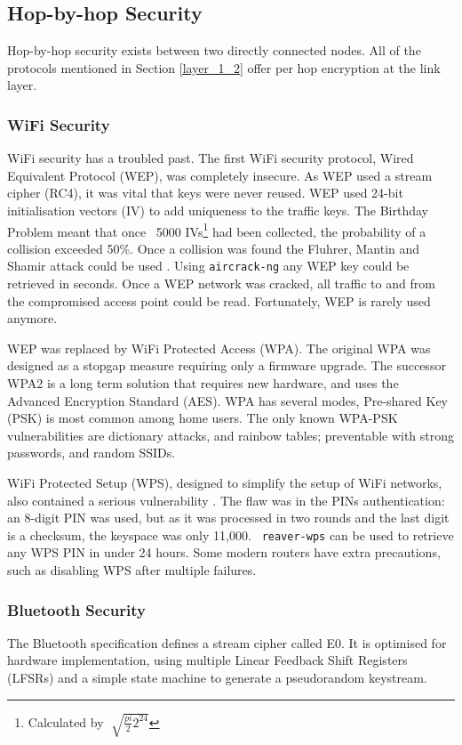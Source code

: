 \documentclass[10pt,journal,compsoc]{IEEEtran}
\begin{document}
\subsection{Hop-by-hop Security}
Hop-by-hop security exists between two directly connected nodes. All of the
protocols mentioned in Section \ref{layer_1_2} offer per hop encryption at the
link layer. 

\subsubsection{WiFi Security}
WiFi security has a troubled past. The first WiFi security protocol, Wired
Equivalent Protocol (WEP), was completely insecure. As WEP used a stream cipher
(RC4), it was vital that keys were never reused. WEP used 24-bit initialisation
vectors (IV) to add uniqueness to the traffic keys. The Birthday Problem meant
that once ~5000 IVs\footnote{Calculated by $\sqrt[]{\frac{pi}{2} 2^{24}} $}
had been collected, the probability of a collision exceeded 50\%. Once a
collision was found the Fluhrer, Mantin and Shamir attack could be used
\cite{Fluhrer2001}. Using {\tt aircrack-ng} any WEP key could be retrieved in
seconds. Once a WEP network was cracked, all traffic to and from the
compromised access point could be read. Fortunately, WEP is rarely used
anymore.

WEP was replaced by WiFi Protected Access (WPA). The original WPA was designed
as a stopgap measure requiring only a firmware upgrade. The successor WPA2 is a
long term solution that requires new hardware, and uses the Advanced Encryption
Standard (AES). WPA has several modes, Pre-shared Key (PSK) is most common
among home users. The only known WPA-PSK vulnerabilities are dictionary
attacks, and rainbow tables; preventable with strong passwords, and random
SSIDs. 

WiFi Protected Setup (WPS), designed to simplify the setup of WiFi networks,
also contained a serious vulnerability \cite{Viehbock2011}. The flaw was in the
PINs authentication: an 8-digit PIN was used, but as it was processed in two
rounds and the last digit is a checksum, the keyspace was only 11,000. {\tt
reaver-wps} can be used to retrieve any WPS PIN in under 24 hours. Some modern
routers have extra precautions, such as disabling WPS after multiple failures. 

\subsubsection{Bluetooth Security}
The Bluetooth specification \cite{BTSpec} defines a stream cipher called E0.
It is optimised for  hardware implementation, using multiple Linear Feedback
Shift Registers (LFSRs) and a simple state machine to generate a pseudorandom
keystream. 
\end{document}
